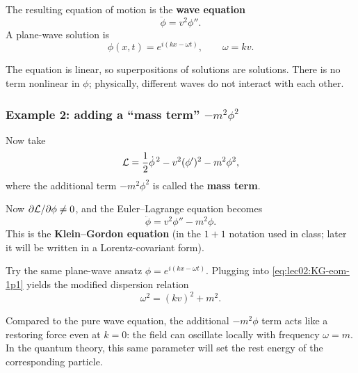 The resulting equation of motion is the \textbf{wave equation}
\begin{equation}
  \ddot\phi = v^2 \phi''.
  \label{eq:lec02:wave-eom}
\end{equation}
A plane-wave solution is
\begin{equation}
  \phi(x,t) = e^{i(kx-\omega t)},
  \qquad
  \omega = kv.
  \label{eq:lec02:wave-sol}
\end{equation}

\begin{remark}
The equation is linear, so superpositions of solutions are solutions.
There is no term nonlinear in \(\phi\); physically, different waves do
not interact with each other.
\end{remark}

\subsubsection*{Example 2: adding a ``mass term'' \(-m^2\phi^2\)}

Now take
\begin{equation}
  \mathcal{L} = \frac12 \dot\phi^{\,2} - v^2(\phi')^2 - m^2 \phi^2,
  \label{eq:lec02:L-KG}
\end{equation}
where the additional term \(-m^2\phi^2\) is called the \textbf{mass term}.

Now \(\partial\mathcal{L}/\partial\phi\neq 0\), and the Euler--Lagrange equation
becomes
\begin{equation}
  \ddot\phi = v^2\phi'' - m^2 \phi.
  \label{eq:lec02:KG-eom-1p1}
\end{equation}
This is the \textbf{Klein--Gordon equation} (in the \(1+1\) notation used
in class; later it will be written in a Lorentz-covariant form).

Try the same plane-wave ansatz \(\phi=e^{i(kx-\omega t)}\). Plugging into
\eqref{eq:lec02:KG-eom-1p1} yields the modified dispersion relation
\begin{equation}
  \omega^2 = (kv)^2 + m^2.
  \label{eq:lec02:KG-dispersion}
\end{equation}

\begin{remark}
Compared to the pure wave equation, the additional \(-m^2\phi\) term acts
like a restoring force even at \(k=0\): the field can oscillate locally
with frequency \(\omega=m\). In the quantum theory, this same parameter
will set the rest energy of the corresponding particle.
\end{remark}

